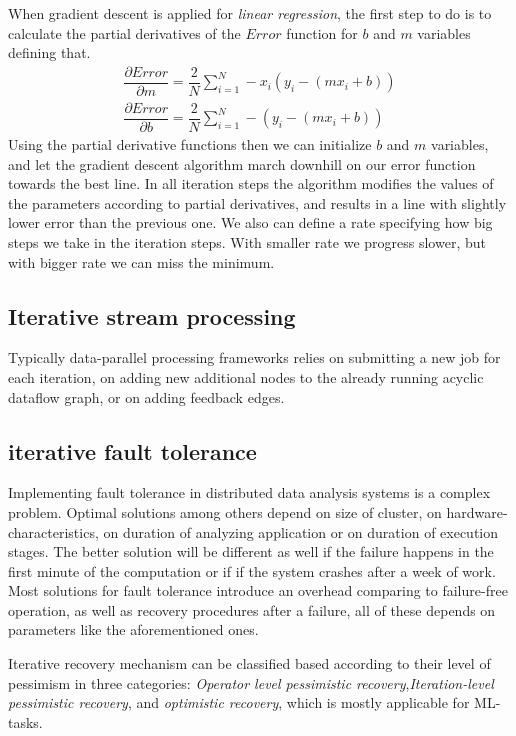 When gradient descent is applied for \textit{linear regression}, the first step to do is to calculate the partial derivatives of the $Error$ function for  $b$ and $m$ variables defining that.
\begin{align}
\dfrac{\partial Error}{\partial m} = \dfrac{2}{N}\sum_{i=1}^{N} -x_i(y_i-(mx_i+b)) \\
\dfrac{\partial Error}{\partial b} = \dfrac{2}{N}\sum_{i=1}^{N} -(y_i-(mx_i+b))
\end{align}
Using the partial derivative functions then we can initialize $b$ and $m$ variables, and let the gradient descent  algorithm march downhill on our error function towards the best line. In all iteration steps the algorithm modifies the values of the parameters according to partial derivatives, and results in a line with slightly lower error than the previous one. We also can define a rate specifying how big steps we take in the iteration steps. With smaller rate we progress slower, but with bigger rate we can miss the minimum. 
\cite{gradientdescent}%
\subsection{Iterative stream processing}
Typically data-parallel processing frameworks relies on  submitting a new job for each iteration, on adding new additional nodes to the already running acyclic dataflow graph, or on adding feedback edges. 
\subsection{iterative fault tolerance}
Implementing fault tolerance in distributed data analysis systems is a complex problem. Optimal solutions\cite{allroadsleadtorome} among others depend on size of cluster, on hardware-characteristics, on duration of analyzing application or on duration of execution stages. The better solution will be different  as well if the failure happens in the first minute of the computation or if if the system crashes after a week of work.
Most solutions for fault tolerance introduce an overhead comparing to failure-free operation, as well as recovery procedures after a failure, all of these depends on parameters like the aforementioned ones.

Iterative recovery mechanism can be classified based according to their level of pessimism in three categories\cite{allroadsleadtorome}: \textit{Operator level pessimistic recovery},\textit{Iteration-level pessimistic recovery}, and \textit{optimistic recovery}, which is mostly applicable for ML-tasks. 

